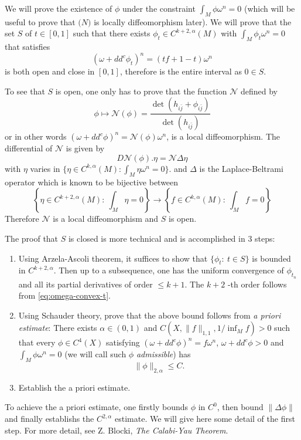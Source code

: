 \documentclass[11pt]{article}
\begin{document}
We will prove the existence of \(\phi\) under the constraint
\(\int_M\phi\omega^n = 0\) (which will be useful to prove that \(\mathcal(N)\) is locally diffeomorphism
later). We will prove that the set \(S\) of \(t\in [0,1]\) such that there exists \(\phi_t\in
C^{k+2,\alpha}(M)\) with \(\int_M \phi_t\omega^n = 0\) that satisfies
\begin{equation}
\label{eq:omega-convex-t}
(\omega + dd^c\phi_t)^n = (tf + 1-t)\omega^n
\end{equation}
is both open and close in \([0,1]\), therefore is the entire interval as \(0\in S\).

To see that \(S\) is open, one only has to prove that the function \(\mathcal{N}\) defined by
\[
\phi\mapsto \mathcal{N}(\phi)= \frac{\det(h_{i\bar j} + \phi_{i\bar j})}{\det(h_{i\bar j})}
\]
or in other words \((\omega + dd^c\phi)^n = \mathcal{N}(\phi)\omega^n\), is a local
diffeomorphism. The differential of \(\mathcal{N}\) is given by
\[
D \mathcal{N}(\phi).\eta = \mathcal{N}\Delta\eta
\]
with \(\eta\) varies in \(\{\eta\in C^{k,\alpha}(M):\int_M\eta\omega^n=0\}\). and \(\Delta\) is the
Laplace-Beltrami operator which is known to be bijective between
\[
\left\{\eta\in C^{k+2,\alpha}(M):\ \int_M\eta = 0\right\} \longrightarrow \left\{f\in C^{k,\alpha}(M):\ \int_M f=0\right\}
\]
Therefore \(\mathcal{N}\) is a local diffeomorphism and \(S\) is open.

The proof that \(S\) is closed is more technical and is accomplished in 3 steps:
\begin{enumerate}
\item Using Arzela-Ascoli theorem, it suffices to show that \(\{\phi_t:\ t\in S\}\) is bounded in
\(C^{k+2,\alpha}\). Then up to a subsequence, one has the uniform convergence of \(\phi_{t_n}\)
and all its partial derivatives of order \(\leq k+1\). The \(k+2\) -th order follows from \eqref{eq:omega-convex-t}.
\item Using Schauder theory, prove that the above bound follows from \emph{a priori estimate}: \newline There exists
\(\alpha\in (0,1)\) and \(C(X,\|f\|_{1,1}, 1/\inf_M f)>0\) such that every \(\phi\in C^4(X)\)
satisfying \((\omega +dd^c\phi)^n = f\omega^n\), \(\omega + dd^c\phi >0\) and \(\int_M \phi\omega^n=0\)
(we will call such \(\phi\) \emph{admissible})
has \[\|
   \phi\|_{2,\alpha} \leq C.\]
\item Establish the a priori estimate.
\end{enumerate}

To achieve the a priori estimate, one firstly bounds \(\phi\) in \(C^0\), then bound \(\| \Delta\phi\|\)
and finally establishs the \(C^{2,\alpha}\) estimate. We will give here some detail of the first
step. For more detail, see Z. Blocki, \emph{The Calabi-Yau Theorem}.
\end{document}
